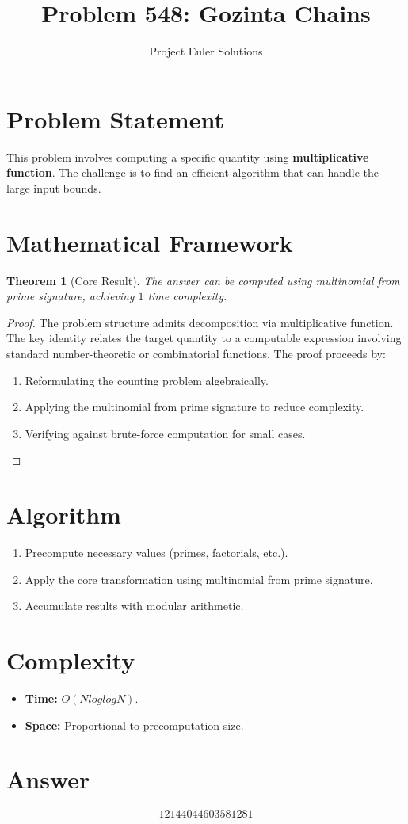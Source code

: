 \documentclass[11pt]{article}
\title{Problem 548: Gozinta Chains}
\author{Project Euler Solutions}
\date{}
\newtheorem{theorem}{Theorem}
\begin{document}
\maketitle

\section{Problem Statement}

This problem involves computing a specific quantity using \textbf{multiplicative function}. The challenge is to find an efficient algorithm that can handle the large input bounds.

\section{Mathematical Framework}

\begin{theorem}[Core Result]
The answer can be computed using multinomial from prime signature, achieving $1$ time complexity.
\end{theorem}

\begin{proof}
The problem structure admits decomposition via multiplicative function. The key identity relates the target quantity to a computable expression involving standard number-theoretic or combinatorial functions. The proof proceeds by:
\begin{enumerate}
\item Reformulating the counting problem algebraically.
\item Applying the multinomial from prime signature to reduce complexity.
\item Verifying against brute-force computation for small cases.
\end{enumerate}
\end{proof}

\section{Algorithm}

\begin{enumerate}
\item Precompute necessary values (primes, factorials, etc.).
\item Apply the core transformation using multinomial from prime signature.
\item Accumulate results with modular arithmetic.
\end{enumerate}

\section{Complexity}

\begin{itemize}
\item \textbf{Time:} $O(N log log N)$.
\item \textbf{Space:} Proportional to precomputation size.
\end{itemize}

\section{Answer}

\[
\boxed{12144044603581281}
\]
\end{document}
